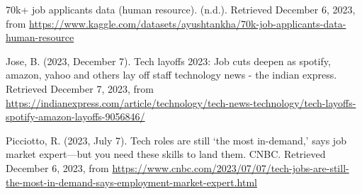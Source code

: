 \documentclass[
  man]{apa6}
\newlength{\cslhangindent}
\newlength{\cslentryspacingunit} %
\newenvironment{CSLReferences}[2] %
 {%
  \setlength{\parindent}{0pt}
  \ifodd #1
  \let\oldpar\par
  \def\par{\hangindent=\cslhangindent\oldpar}
  \fi
  \setlength{\parskip}{#2\cslentryspacingunit}
 }%
 {}
\begin{document}
\hypertarget{refs}{}
\begin{CSLReferences}{1}{0}
\leavevmode{}%
70k+ job applicants data (human resource). (n.d.). Retrieved December 6, 2023, from \url{https://www.kaggle.com/datasets/ayushtankha/70k-job-applicants-data-human-resource}

\leavevmode{}%
Jose, B. (2023, December 7). Tech layoffs 2023: Job cuts deepen as spotify, amazon, yahoo and others lay off staff {\textbar} technology news - the indian express. Retrieved December 7, 2023, from \url{https://indianexpress.com/article/technology/tech-news-technology/tech-layoffs-spotify-amazon-layoffs-9056846/}

\leavevmode{}%
Picciotto, R. (2023, July 7). Tech roles are still `the most in-demand,' says job market expert---but you need these skills to land them. {CNBC}. Retrieved December 6, 2023, from \url{https://www.cnbc.com/2023/07/07/tech-jobs-are-still-the-most-in-demand-says-employment-market-expert.html}

\end{CSLReferences}
\end{document}
